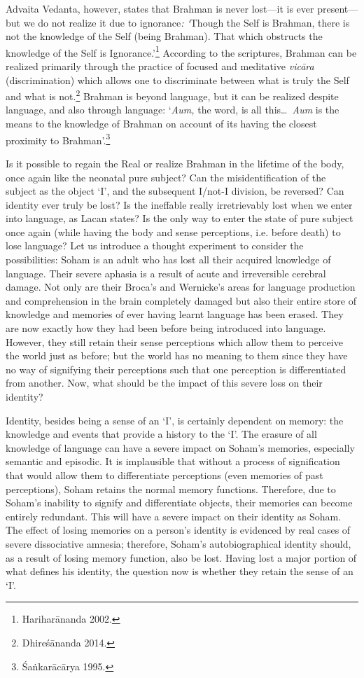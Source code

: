 Advaita Vedanta, however, states that Brahman is never lost---it is
ever present---but we do not realize it due to ignorance\emph{:
`}Though the Self is Brahman, there is not the knowledge of the Self
(being Brahman). That which obstructs the knowledge of the Self is
Ignorance.'\footnote{Harihar\=ananda 2002.} According to the scriptures, Brahman
can be realized primarily through the practice of focused and meditative
\emph{vic\=ara} (discrimination) which allows one to discriminate between
what is truly the Self and what is not.\footnote{Dhire\'s\=ananda 2014.}
Brahman is beyond language, but it can be realized despite language, and
also through language: `\emph{Aum,} the word, is all this\ldots\
\emph{Aum} is the means to the knowledge of Brahman on account of its
having the closest proximity to Brahman'.\footnote{\'Sa\.nkar\=ac\=arya 1995.}

Is it possible to regain the Real or realize Brahman in the lifetime of
the body, once again like the neonatal pure subject? Can the
misidentification of the subject as the object `I', and the subsequent
I/not-I division, be reversed? Can identity ever truly be lost? Is the
ineffable really irretrievably lost when we enter into language, as
Lacan states? Is the only way to enter the state of pure subject once
again (while having the body and sense perceptions, i.e. before death)
to lose language? Let us introduce a thought experiment to consider the
possibilities: Soham is an adult who has lost all their acquired
knowledge of language. Their severe aphasia is a result of acute and
irreversible cerebral damage. Not only are their Broca's and Wernicke's
areas for language production and comprehension in the brain completely
damaged but also their entire store of knowledge and memories of ever
having learnt language has been erased. They are now exactly how they
had been before being introduced into language. However, they still
retain their sense perceptions which allow them to perceive the world
just as before; but the world has no meaning to them since they have no
way of signifying their perceptions such that one perception is
differentiated from another. Now, what should be the impact of this
severe loss on their identity?

Identity, besides being a sense of an `I', is certainly dependent on
memory: the knowledge and events that provide a history to the `I'. The
erasure of all knowledge of language can have a severe impact on Soham's
memories, especially semantic and episodic. It is implausible that
without a process of signification that would allow them to
differentiate perceptions (even memories of past perceptions), Soham
retains the normal memory functions. Therefore, due to Soham's inability
to signify and differentiate objects, their memories can become entirely
redundant. This will have a severe impact on their identity as Soham.
The effect of losing memories on a person's identity is evidenced by
real cases of severe dissociative amnesia; therefore, Soham's
autobiographical identity should, as a result of losing memory function,
also be lost. Having lost a major portion of what defines his identity,
the question now is whether they retain the sense of an `I'.

